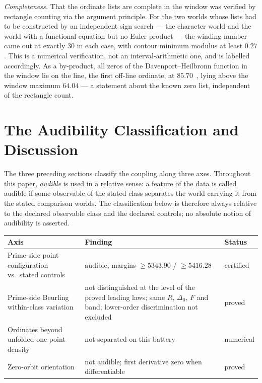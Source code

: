 \documentclass[11pt]{article}
\begin{document}
\emph{Completeness.} That the ordinate lists are complete in the window was
verified by rectangle counting via the argument principle. For the two worlds
whose lists had to be constructed by an independent sign search --- the
character world and the world with a functional equation but no Euler product
--- the winding number came out at exactly $30$ in each case, with contour
minimum modulus at least $0.27$. This is a numerical verification, not an
interval-arithmetic one, and is labelled accordingly. As a by-product, all
zeros of the Davenport--Heilbronn function in the window lie on the line, the
first off-line ordinate, at $85.70$~\cite{Spira94}, lying above the window
maximum $64.04$ --- a statement about the known zero list, independent of the
rectangle count.

\section{The Audibility Classification and Discussion}
\label{sec:discussion}

The three preceding sections classify the coupling along three axes.
Throughout this paper, \emph{audible} is used in a relative sense: a feature
of the data is called audible if some observable of the stated class
separates the world carrying it from the stated comparison worlds. The
classification below is therefore always relative to the declared observable
class and the declared controls; no absolute notion of audibility is
asserted.

\begin{center}
\begin{tabular}{@{}l p{4.6cm} l@{}}
\toprule
Axis & Finding & Status \\
\midrule
Prime-side point configuration vs.\ stated controls & audible, margins
  $\ge5343.90$ / $\ge5416.28$ & certified \\
Prime-side Beurling within-class variation & \raggedright not distinguished at the
  level of the proved leading laws; same $R$, $\Delta_0$, $F$ and band;
  lower-order discrimination not excluded & proved \tabularnewline
Ordinates beyond unfolded one-point density & not separated on this battery &
numerical \\
Zero-orbit orientation & not audible; first derivative zero when
  differentiable & proved \\
\bottomrule
\end{tabular}
\end{center}
\end{document}

